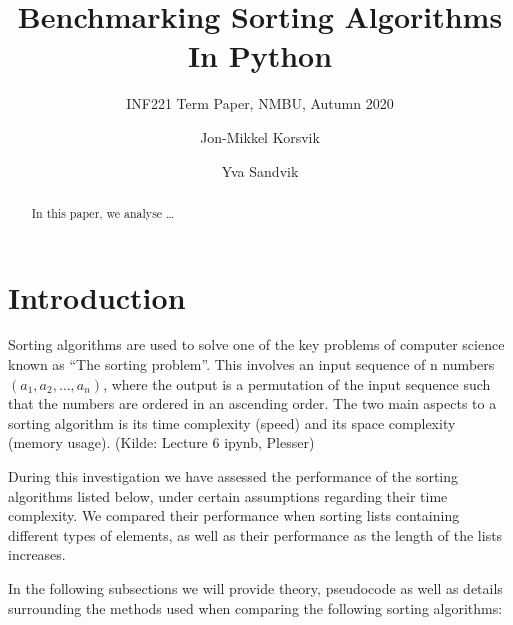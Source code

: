 \documentclass[sigconf, nonacm, natbib, screen, balance=False]{acmart}
\begin{document}
\title{Benchmarking Sorting Algorithms In Python}
\subtitle{INF221 Term Paper, NMBU, Autumn 2020}

\author{Jon-Mikkel Korsvik}
\affiliation{}  %

\author{Yva Sandvik}

\begin{abstract}
  In this paper, we analyse \dots 
\end{abstract}


\maketitle

\section{Introduction}\label{sec:intro}

Sorting algorithms are used to solve one of the key problems of computer science known as “The sorting problem”. This involves an input sequence of n numbers $(a_1, a_2, … , a_n)$, where the output is a permutation of the input sequence such that the numbers are ordered in an ascending order. The two main aspects to a sorting algorithm is its time complexity (speed) and its space complexity (memory usage). (Kilde: Lecture 6 ipynb, Plesser)

During this investigation we have assessed the performance of the sorting algorithms listed below, under certain assumptions regarding their time complexity. We compared their performance when sorting lists containing different types of elements, as well as their performance as the length of the lists increases. 

In the following subsections we will provide theory, pseudocode as well as details surrounding the methods used when comparing the following sorting algorithms: 
\end{document}
